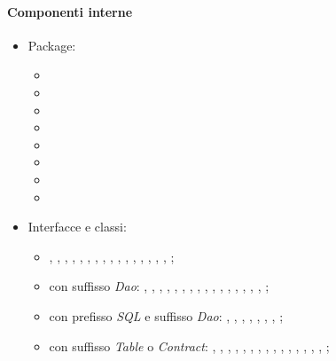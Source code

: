 \documentclass[../Funzionalita.tex]{subfiles}
\begin{document}
			\paragraph*{Componenti interne}
			\begin{itemize}
			
				\item Package:
				\begin{itemize}
					\item[] \model
					\item[] \dataaccess
					\item[] \service
					\item[] \dao
					\item[] \graph
					\item[] \edge
					\item[] \vertex
					\item[] \area
				\end{itemize}
				
				\item Interfacce e classi:
				\begin{itemize}
					\item[] \BuildingMap, \BuildingMapImp, \BuildingInformation, \PointOfInterest, \RegionOfInterest, \EnrichedEdge, \DatabaseService, \BuildingService, \EdgeService, \PhotoService, \PointOfInterestService, \RegionOfInterestService, \ServiceHelper,
					\CursorConverter, \DaoFactoryHelper, \RemoteDaoFactory, \SQLiteDaoFactory;
					
					\item[] con suffisso \textit{Dao}: 
					\SQLDao, \BuildingDao, \CategoryDao, \EdgeDao, \EdgeTypeDao, \PhotoDao, \PointOfInterestDao, \RegionOfInterestDao, \RoiPoiDao, \RemoteBuildingDao, \RemoteCategoryDao, \RemoteEdgeDao, \RemoteEdgeTypeDao,  \RemotePhotoDao,  \RemotePointOfInterestDao, \RemoteRegionOfInterestDao, \RemoteRoiPoiDao;
					
					\item[] con prefisso \textit{SQL} e suffisso \textit{Dao}:
						\SQLiteBuildingDao, \SQLiteCategoryDao, \SQLiteEdgeDao, \SQLitePhotoDao, \SQLiteEdgeTypeDao, \SQLitePointOfInterestDao, \SQLiteRegionOfInterestDao, \SQLiteRoiPoiDao;
						
					\item[] con suffisso \textit{Table} o \textit{Contract}:
						\BuildingTable, \BuildingContract,
					 \CategoryTable, \CategoryContract,
					\EdgeTable, \EdgeContract,
					 \EdgeTypeTable, \EdgeTypeContract,
					\PhotoTable, \PhotoContract,
					 \PointOfInterestTable, \PointOfInterestContract,
					  \RegionOfInterestTable, \RegionOfInterestContract,
					  \RoiPoiTable, \RoiPoiContract;
				\end{itemize}
			\end{itemize}
			
\end{document}
